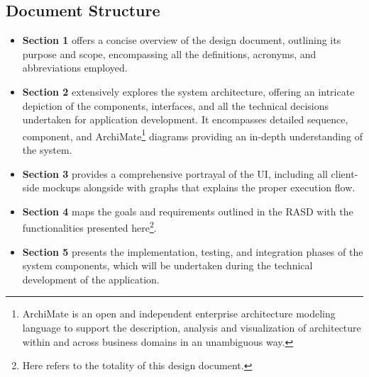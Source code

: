 \documentclass[../DD.tex]{subfiles}
\begin{document}
    \subsection{Document Structure}\label{subsec:document_structure}
    \begin{itemize}
        \item {\textbf{Section 1} offers a concise overview of the design document, outlining its purpose and scope, encompassing all the definitions, acronyms, and abbreviations employed.}
        \item {\textbf{Section 2} extensively explores the system architecture, offering an intricate depiction of the components, interfaces, and all the technical decisions undertaken for application development. 
        It encompasses detailed sequence, component, and ArchiMate\footnote{ArchiMate is an open and independent enterprise architecture modeling language to support the description, analysis and visualization of architecture within and across business domains in an unambiguous way\cite{ArchiMate}.} diagrams providing an in-depth understanding of the system.}
        \item {\textbf{Section 3} provides a comprehensive portrayal of the UI, including all client-side mockups alongside with graphs that explains the proper execution flow.}
        \item {\textbf{Section 4} maps the goals and requirements outlined in the RASD with the functionalities presented here\footnote{Here refers to the totality of this design document.}.}
        \item {\textbf{Section 5} presents the implementation, testing, and integration phases of the system components, which will be undertaken during the technical development of the application.}
    \end{itemize}
\end{document}
